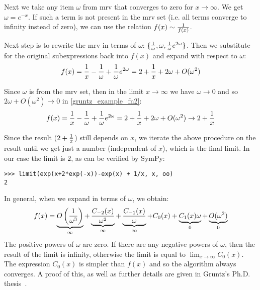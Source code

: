 Next we take any item $\omega$ from mrv that converges to zero for
$x\to\infty$.  We get $\omega=e^{-x}$. If such a term is not present in the mrv
set (i.e. all terms converge to infinity instead of zero), we can use the
relation $f(x)\sim {1\over f(x)}$.

Next step is to rewrite the mrv in terms of $\omega$: $\{{1\over\omega},
\omega, {1\over\omega}e^{2\omega}\}$. Then we substitute for the original
subexpressions back into $f(x)$ and expand with respect to $\omega$:
\begin{equation}
    \label{gruntz_example_fn2}
f(x) = {1\over x}-{1\over\omega}+{1\over\omega}e^{2\omega}
     = 2+{1\over x} + 2\omega + O(\omega^2)
\end{equation}

Since $\omega$ is from the mrv set, then in the limit $x\to\infty$ we have
$\omega\to0$ and so $2\omega + O(\omega^2) \to 0$ in
\eqref{gruntz_example_fn2}:
\begin{equation}
f(x) = {1\over x}-{1\over\omega}+{1\over\omega}e^{2\omega}
    = 2+{1\over x} + 2\omega + O(\omega^2)
    \to 2 + {1\over x}
\end{equation}

Since the result ($2+{1\over x}$) still depends on $x$,
we iterate the above procedure on the result until we get just a number
(independent of $x$), which is the final limit. In our case the limit is $2$,
as can be verified by SymPy:

\begin{verbatim}
>>> limit(exp(x+2*exp(-x))-exp(x) + 1/x, x, oo)
2
\end{verbatim}

In general, when we expand in terms of $\omega$, we obtain:
\begin{equation}
f(x) = \underbrace{O\left({1\over \omega^3}\right)}_\infty
    + \underbrace{C_{-2}(x)\over \omega^2}_\infty
    + \underbrace{C_{-1}(x)\over \omega}_\infty
    + {C_{0}(x)}
    + \underbrace{C_{1}(x)\omega}_0
    + \underbrace{O(\omega^2)}_0
\end{equation}
The positive powers of $\omega$ are zero. If there are any negative powers of
$\omega$, then the result of the limit is infinity, otherwise the limit is
equal to $\lim_{x\to\infty} C_0(x)$. The expression $C_0(x)$ is simpler than
$f(x)$ and so the algorithm always converges. A proof of this, as well as
further details are given in Gruntz's Ph.D. thesis~\cite{Gruntz1996limits}.

